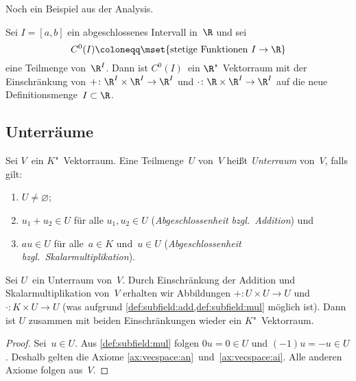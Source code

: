 \documentclass[a4paper]{article}
\begin{document}
Noch ein Beispiel aus der Analysis.

\begin{example}
    Sei $I = [a,b]$ ein abgeschlossenes Intervall in~$\R$ und sei
    \begin{equation*}
        C^0(I) \coloneqq \mset{\text{stetige Funktionen } I \to \R}
    \end{equation*}
    eine Teilmenge von~$\R^I$. Dann ist $C^0(I)$~ein $\R$"~Vektorraum mit der Einschränkung von $+\colon \R^I\times\R^I \to \R^I$ und $\cdot\colon \R\times\R^I \to \R^I$ auf die neue Definitionsmenge~$I \subset \R$.
\end{example}


\subsection{Unterräume}

\begin{definition}
    Sei $V$~ein $K$"~Vektorraum. Eine Teilmenge~$U$ von~$V$ heißt \emph{Unterraum} von~$V$, falls gilt:
    \begin{enumerate}
        \item $U \neq \varnothing$;
        \item $u_1+u_2 \in U$ für alle $u_1,u_2 \in U$ (\emph{Abgeschlossenheit bzgl.\ Addition}) und\label{def:subspace:add}
        \item $au \in U$ für alle~$a \in K$ und~$u \in U$ (\emph{Abgeschlossenheit bzgl.\ Skalarmultiplikation}).\label{def:subspace:mul}
    \end{enumerate}
\end{definition}

\begin{lemma}
    Sei $U$~ein Unterraum von~$V$. Durch Einschränkung der Addition und Skalarmultiplikation von~$V$ erhalten wir Abbildungen $+\colon U\times U \to U$ und $\cdot\colon K\times U \to U$ (was aufgrund \cref{def:subfield:add,def:subfield:mul} möglich ist). Dann ist $U$ zusammen mit beiden Einschränkungen wieder ein $K$"~Vektorraum.
\end{lemma}

\begin{proof}
    Sei~$u \in U$. Aus \cref{def:subfield:mul} folgen $0u = 0 \in U$ und $(-1)u = -u \in U$. Deshalb gelten die Axiome \ref{ax:vecspace:an}~und~\ref{ax:vecspace:ai}. Alle anderen Axiome folgen aus~$V$.
\end{proof}
\end{document}
